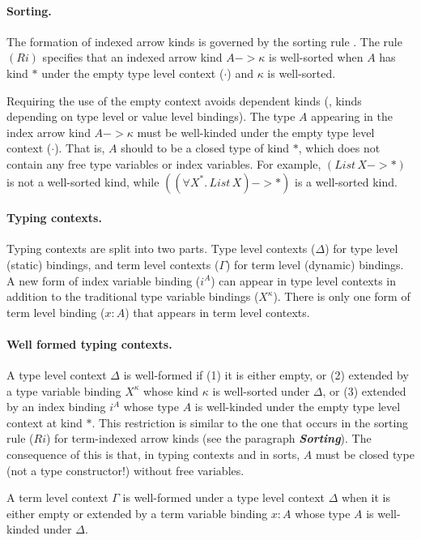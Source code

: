 \paragraph{Sorting.} \label{sorting}
The formation of indexed arrow kinds is
governed by the sorting rule . The rule $(Ri)$ specifies that
an indexed arrow kind $A -> \kappa$ is well-sorted when $A$ has kind $*$
under the empty type level context ($\cdot$) and $\kappa$ is well-sorted.

Requiring the use of the empty context avoids dependent kinds (\ie, kinds depending on type level or value level
bindings). The type $A$ appearing in
the index arrow kind $A -> \kappa$ must be well-kinded under
the empty type level context ($\cdot$).
That is, $A$ should to be a closed type of kind $*$,
which does not contain any free type variables or index variables.
For example, $(\textit{List}\,X -> *)$ is not a well-sorted kind,
while $((\forall X^{*}\!.\,\textit{List}\,X) -> *)$ is a well-sorted kind.

\paragraph{Typing contexts.}
Typing contexts are split into two parts.
Type level contexts ($\Delta$) for type level (static) bindings,
and term level contexts ($\Gamma$) for term level (dynamic) bindings.
A new form of index variable binding ($i^A$) can appear in
type level contexts in addition to the traditional type variable bindings ($X^\kappa$).
There is only one form of term level binding ($x:A$) that appears in
term level contexts.

\paragraph{Well formed typing contexts.}
A type level context $\Delta$ is well-formed if (1) it is either empty,
or (2) extended by a type variable binding $X^\kappa$ whose kind $\kappa$ is
well-sorted under $\Delta$, or (3) extended by an index binding $i^A$
whose type $A$ is well-kinded under the empty type level context at kind $*$.
This restriction is similar to the one that occurs in the sorting rule ($Ri$)
for term-indexed arrow kinds (see the paragraph {\bf\textit{Sorting}}).
The consequence of this is that, in typing contexts and in sorts,
$A$ must be closed type (not a type constructor!) without free variables.

A term level context $\Gamma$ is well-formed under a type level context
$\Delta$ when it is either empty or extended by a term variable binding
$x:A$ whose type $A$ is well-kinded under $\Delta$.


